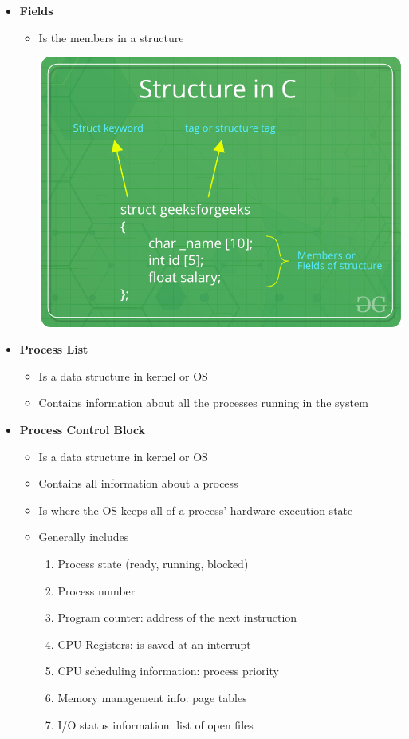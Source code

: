 \documentclass[12pt]{article}
\begin{document}
\begin{itemize}
    \item \textbf{Fields}

    \begin{itemize}
        \item Is the members in a structure

        \bigskip

        \begin{center}
        \includegraphics[width=0.6\linewidth]{images/midterm_1_solution_15.png}
        \end{center}
    \end{itemize}

    \item \textbf{Process List}

    \begin{itemize}
        \item Is a data structure in kernel or OS
        \item Contains information about all the processes running in the system
    \end{itemize}

    \item \textbf{Process Control Block}

    \begin{itemize}
        \item Is a data structure in kernel or OS
        \item Contains all information about a process
        \item Is where the OS keeps all of a process' hardware execution state
        \item Generally includes

        \begin{enumerate}[1.]
            \item Process state (ready, running, blocked)
            \item Process number
            \item Program counter: address of the next instruction
            \item CPU Registers: is saved at an interrupt
            \item CPU scheduling information: process priority
            \item Memory management info: page tables
            \item I/O status information: list of open files
        \end{enumerate}
    \end{itemize}
\end{itemize}
\end{document}
